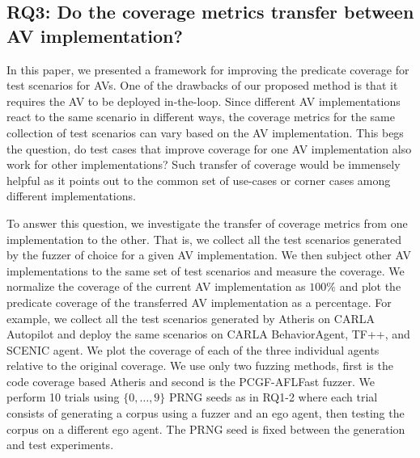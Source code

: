 \subsection{RQ3: Do the coverage metrics transfer between AV implementation?}

In this paper, we presented a framework for improving the predicate coverage for test scenarios for AVs.
% 
One of the drawbacks of our proposed method is that it requires the AV to be deployed in-the-loop.
% 
Since different AV implementations react to the same scenario in different ways, the coverage metrics for the same collection of test scenarios can vary based on the AV implementation.
% 
This begs the question, do test cases that improve coverage for one AV implementation also work for other implementations?
% 
Such transfer of coverage would be immensely helpful as it points out to the common set of use-cases or corner cases among different implementations.

To answer this question, we investigate the transfer of coverage metrics from one implementation to the other.
% 
That is, we collect all the test scenarios generated by the fuzzer of choice for a given AV implementation.
% 
We then subject other AV implementations to the same set of test scenarios and measure the coverage.
% 
We normalize the coverage of the current AV implementation as $100\%$ and plot the predicate coverage of the transferred AV implementation as a percentage.
% 
For example, we collect all the test scenarios generated by Atheris on CARLA Autopilot and deploy the same scenarios on CARLA BehaviorAgent, TF++, and SCENIC agent.
% 
We plot the coverage of each of the three individual agents relative to the original coverage.
% 
We use only two fuzzing methods, first is the code coverage based Atheris and second is the PCGF-AFLFast fuzzer. 
%
We perform 10 trials using $\{ 0, \dots, 9 \}$ PRNG seeds as in RQ1-2 where each trial consists of generating a corpus using a fuzzer and an ego agent, then testing the corpus on a different ego agent.
%
The PRNG seed is fixed between the generation and test experiments.
%

% 


% 
% 


